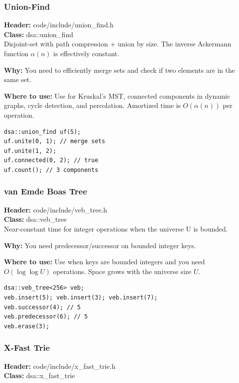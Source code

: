 \documentclass[11pt]{article}
\begin{document}
\subsubsection{Union-Find}
\textbf{Header:} code/include/union\_find.h\\
\textbf{Class:} dsa::union\_find\\

Disjoint-set with path compression + union by size. The inverse Ackermann function $\alpha(n)$ is effectively constant.

\textbf{Why:} You need to efficiently merge sets and check if two elements are in the same set. \par \textbf{Where to use:} Use for Kruskal's MST, connected components in dynamic graphs, cycle detection, and percolation. Amortized time is \(O(\alpha(n))\) per operation.

\begin{lstlisting}
dsa::union_find uf(5);
uf.unite(0, 1); // merge sets
uf.unite(1, 2);
uf.connected(0, 2); // true
uf.count(); // 3 components
\end{lstlisting}

\subsubsection{van Emde Boas Tree}
\textbf{Header:} code/include/veb\_tree.h\\
\textbf{Class:} dsa::veb\_tree\\

Near-constant time for integer operations when the universe U is bounded.

\textbf{Why:} You need predecessor/successor on bounded integer keys. \par \textbf{Where to use:} Use when keys are bounded integers and you need \(O(\log\log U)\) operations. Space grows with the universe size \(U\).

\begin{lstlisting}
dsa::veb_tree<256> veb;
veb.insert(5); veb.insert(3); veb.insert(7);
veb.successor(4); // 5
veb.predecessor(6); // 5
veb.erase(3);
\end{lstlisting}

\subsubsection{X-Fast Trie}
\textbf{Header:} code/include/x\_fast\_trie.h\\
\textbf{Class:} dsa::x\_fast\_trie\\
\end{document}
